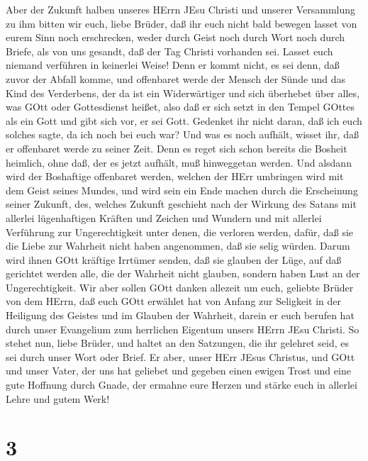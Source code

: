  Aber der Zukunft halben unseres HErrn JEsu Christi und
unserer Versammlung zu ihm bitten wir euch, liebe Brüder, 
daß ihr euch nicht bald bewegen lasset von eurem Sinn noch erschrecken,
weder durch Geist noch durch Wort noch durch Briefe, als von uns
gesandt, daß der Tag Christi vorhanden sei.  Lasset euch
niemand verführen in keinerlei Weise! Denn er kommt nicht, es sei denn,
daß zuvor der Abfall komme, und offenbaret werde der Mensch der Sünde
und das Kind des Verderbens,  der da ist ein Widerwärtiger
und sich überhebet über alles, was GOtt oder Gottesdienst heißet, also
daß er sich setzt in den Tempel GOttes als ein Gott und gibt sich vor,
er sei Gott.  Gedenket ihr nicht daran, daß ich euch solches
sagte, da ich noch bei euch war?  Und was es noch aufhält,
wisset ihr, daß er offenbaret werde zu seiner Zeit.  Denn es
reget sich schon bereits die Bosheit heimlich, ohne daß, der es jetzt
aufhält, muß hinweggetan werden.  Und alsdann wird der
Boshaftige offenbaret werden, welchen der HErr umbringen wird mit dem
Geist seines Mundes, und wird sein ein Ende machen durch die Erscheinung
seiner Zukunft,  des, welches Zukunft geschieht nach der
Wirkung des Satans mit allerlei lügenhaftigen Kräften und Zeichen und
Wundern  und mit allerlei Verführung zur Ungerechtigkeit
unter denen, die verloren werden, dafür, daß sie die Liebe zur Wahrheit
nicht haben angenommen, daß sie selig würden.  Darum wird
ihnen GOtt kräftige Irrtümer senden, daß sie glauben der Lüge,
 auf daß gerichtet werden alle, die der Wahrheit nicht
glauben, sondern haben Lust an der Ungerechtigkeit.  Wir
aber sollen GOtt danken allezeit um euch, geliebte Brüder von dem HErrn,
daß euch GOtt erwählet hat von Anfang zur Seligkeit in der Heiligung des
Geistes und im Glauben der Wahrheit,  darein er euch
berufen hat durch unser Evangelium zum herrlichen Eigentum unsers HErrn
JEsu Christi.  So stehet nun, liebe Brüder, und haltet an
den Satzungen, die ihr gelehret seid, es sei durch unser Wort oder
Brief.  Er aber, unser HErr JEsus Christus, und GOtt und
unser Vater, der uns hat geliebet und gegeben einen ewigen Trost und
eine gute Hoffnung durch Gnade,  der ermahne eure Herzen
und stärke euch in allerlei Lehre und gutem Werk!

\hypertarget{section-2}{%
\section{3}\label{section-2}}

